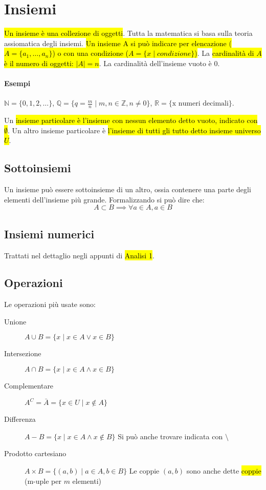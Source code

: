 \section{Insiemi}
\hl{Un insieme è una collezione di oggetti}. Tutta la matematica si basa
sulla teoria assiomatica degli insiemi. \hl{Un insieme A si può indicare
per elencazione ($A = \{a_1, \dots, a_n\}$) o con una condizione
($A = \{x\mid \textit{condizione}\}$)}. La \hl{cardinalità di $A$ è il numero di
oggetti: $|A| = n$}. La cardinalità dell'insieme vuoto è 0.

\paragraph{Esempi} $\mathbb{N} = \{0, 1, 2,\dots\}$,
$\mathbb{Q} = \{q = \frac{m}{n} \mid m,n \in \mathbb{Z}, n \neq 0\}$,
$\mathbb{R} = \{\text{x numeri decimali}\}$.

Un \hl{insieme particolare è l'insieme con nessun elemento detto vuoto, indicato
con $\emptyset$}. Un altro insieme particolare è \hl{l'insieme di tutti gli tutto
detto insieme universo $U$}.

\subsection{Sottoinsiemi}
Un insieme può essere sottoinsieme di un altro, ossia contenere una parte degli
elementi dell'insieme più grande. Formalizzando si può dire che:
\[
    A \subset B \implies \forall a \in A, a \in B
\]

\subsection{Insiemi numerici}
Trattati nel dettaglio negli appunti di \hl{Analisi 1}.

\subsection{Operazioni}
Le operazioni più usate sono:
\begin{description}
    \item[Unione] $A \cup B = \{x \mid x \in A \vee x \in B\}$
    \item[Intersezione] $A \cap B = \{x \mid x \in A \wedge x \in B\}$
    \item[Complementare] $A^C = \bar{A} = \{x \in U \mid x \notin A\}$
    \item[Differenza] $A - B = \{x \mid x \in A \wedge x \notin B\}$
        Si può anche trovare indicata con $ \setminus $
    \item[Prodotto cartesiano] $A \times B = \{(a,b) \mid a \in A, b \in B \}$
        Le coppie $(a,b)$ sono anche dette \hl{coppie} (m-uple per $m$ elementi)
\end{description}

